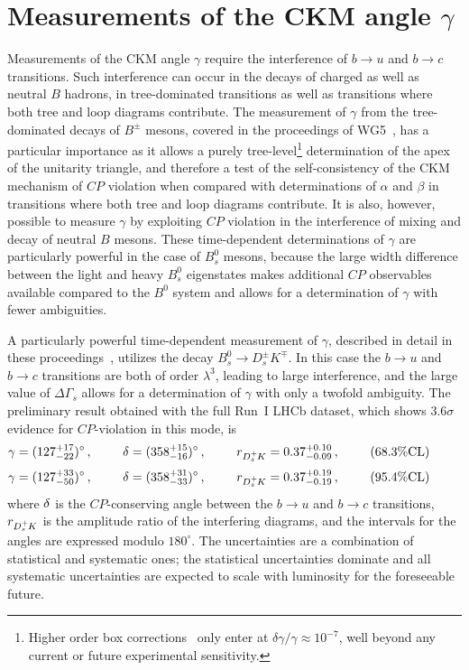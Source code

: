 \section{Measurements of the CKM angle $\gamma$}
\label{sec:gamma}
Measurements of the CKM angle $\gamma$ require the interference of $b\to u$ and $b\to c$ transitions.
Such interference can occur in the decays of charged as well as neutral $B$ hadrons, in tree-dominated
transitions as well as transitions where both tree and loop diagrams contribute.
The measurement of $\gamma$ from the tree-dominated decays of $B^\pm$ mesons, covered in the 
proceedings of WG5~\cite{WG5PROC}, has a particular importance as it allows a purely tree-level\footnote{Higher order box corrections~\cite{ZupanBrodGamma}
only enter at $\delta\gamma/\gamma \approx 10^{-7}$, well beyond any current or future experimental sensitivity.}
determination of the apex of the unitarity triangle, and therefore a test of the self-consistency of the CKM
mechanism of $CP$ violation when compared with determinations of $\alpha$ and $\beta$ in transitions where
both tree and loop diagrams contribute. It is also, however, possible to measure $\gamma$ by exploiting
$CP$ violation in the interference of mixing and decay of neutral $B$ mesons. These time-dependent determinations
of $\gamma$ are particularly powerful in the case of $B^0_s$ mesons, because the large width difference between
the light and heavy $B^0_s$ eigenstates makes additional $CP$ observables available compared
to the $B^0$ system and allows for a determination of $\gamma$ with fewer ambiguities. 

A particularly powerful time-dependent measurement of $\gamma$, described in detail in these proceedings~\cite{DSKPROC}, utilizes the decay $B^0_s \to D^\pm_s K^\mp$.
In this case the $b\to u$ and $b\to c$ transitions are both of order $\lambda^3$, leading to large interference, and
the large value of $\Delta\Gamma_s$ allows for a determination of $\gamma$ with only a twofold ambiguity. 
The preliminary result obtained with the full Run~I LHCb dataset, which shows $3.6\sigma$ evidence for $CP$-violation in this mode, is
\begin{equation}
\gamma      = (127_{-22}^{+17})^\circ\,,\phantom{space}
\delta = (  358_{-16}^{+15})^\circ\,,\phantom{space}
r_{{{D}^+_{s}}\hspace{-0.0625em} K}   = 0.37_{-0.09}^{+0.10}\,,\phantom{space}
(68.3\% \textrm{CL})\phantom{space}  
\end{equation}
\begin{equation}
\gamma      = (127_{-50}^{+33})^\circ\,,\phantom{space}
\delta = (  358_{-33}^{+31})^\circ\,,\phantom{space}
r_{{{D}^+_{s}}\hspace{-0.0625em} K}   = 0.37_{-0.19}^{+0.19}\,,\phantom{space}
(95.4\% \textrm{CL})\phantom{space}  
\end{equation}
where $\delta$ is the $CP$-conserving angle between the $b\to u$ and $b\to c$ transitions,
$r_{{{D}^+_{s}}\hspace{-0.0625em} K}$ is the amplitude ratio of the interfering diagrams, and the intervals for the angles are expressed modulo $180^\circ$.
The uncertainties are a combination of statistical and systematic ones; the statistical uncertainties dominate
and all systematic uncertainties are expected to scale with luminosity for the foreseeable future.

